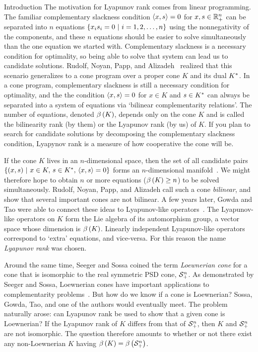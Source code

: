 \documentclass{interact}
\theoremstyle{plain}
\theoremstyle{definition}
\theoremstyle{remark}
\begin{document}
  \begin{section}{Introduction}
    The motivation for Lyapunov rank comes from linear programming.
    The familiar complementary slackness condition $\left\langle{x},{s}\right\rangle = 0$ for
    $x,s \in \Rnplus$ can be separated into $n$ equations
    $\left\lbrace{x_{i}s_{i} = 0}\ \middle|\ {i = 1,2,\ldots,n}\right\rbrace$ using the nonnegativity
    of the components, and these $n$ equations should be easier to
    solve simultaneously than the one equation we started
    with. Complementary slackness is a necessary condition for
    optimality, so being able to solve that system can lead us to
    candidate solutions. Rudolf, Noyan, Papp, and
    Alizadeh~\cite{rudolf-noyan-papp-alizadeh} realized that this
    scenario generalizes to a cone program over a proper cone $K$ and
    its dual $K^{*}$. In a cone program, complementary slackness is
    still a necessary condition for optimality, and the the condition
    $\left\langle{x},{s}\right\rangle = 0$ for $x \in K$ and $s \in K^{*}$ can always be
    separated into a system of equations via `bilinear
    complementarity relations'. The number of equations, denoted
    $\beta\left({ {K} }\right)$, depends only on the cone $K$ and is called the
    bilinearity rank (by them) or the Lyapunov rank (by us) of $K$. If
    you plan to search for candidate solutions by decomposing the
    complementary slackness condition, Lyapynov rank is a measure of
    how cooperative the cone will be.

    If the cone $K$ lives in an $n$-dimensional space, then the set of
    all candidate pairs $\left\lbrace{ \left({x},{s}\right) }\ \middle|\ {x \in K,\, s \in
      K^{*},\, \left\langle{x},{s}\right\rangle = 0}\right\rbrace$ forms an $n$-dimensional
    manifold~\cite{rudolf-noyan-papp-alizadeh}. We might therefore
    hope to obtain $n$ or more equations ($\beta\left({ {K} }\right) \ge n$) to
    be solved simultaneously. Rudolf, Noyan, Papp, and Alizadeh call
    such a cone \emph{bilinear}, and show that several important cones
    are not bilinear. A few years later, Gowda and Tao were able to
    connect these ideas to Lyapunov-like
    operators~\cite{gowda-tao_-_rank}. The Lyapunov-like operators on
    $K$ form the Lie algebra of its automorphism group, a vector space
    whose dimension is $\beta\left({ {K} }\right)$. Linearly independent
    Lyapunov-like operators correspond to `extra' equations, and
    vice-versa. For this reason the name \emph{Lyapunov rank} was
    chosen.

    Around the same time, Seeger and Sossa coined the term
    \emph{Loewnerian cone} for a cone that is isomorphic to the real
    symmetric PSD cone, $\mathcal{S}^{n}_{+}$. As demonstrated by Seeger and
    Sossa, Loewnerian cones have important applications to
    complementarity
    problems~\cite{seeger-sossa_-_complementarity_problems}. But how
    do we know if a cone is Loewnerian? Sossa, Gowda, Tao, and one of
    the authors would eventually meet. The problem naturally arose:
    can Lyapunov rank be used to show that a given cone is Loewnerian?
    If the Lyapunov rank of $K$ differs from that of $\mathcal{S}^{n}_{+}$, then
    $K$ and $\mathcal{S}^{n}_{+}$ are not isomorphic. The question therefore
    amounts to whether or not there exist any non-Loewnerian $K$
    having $\beta\left({ {K} }\right) = \beta\left({ {\mathcal{S}^{n}_{+}} }\right)$.


\end{section}
\end{document}
